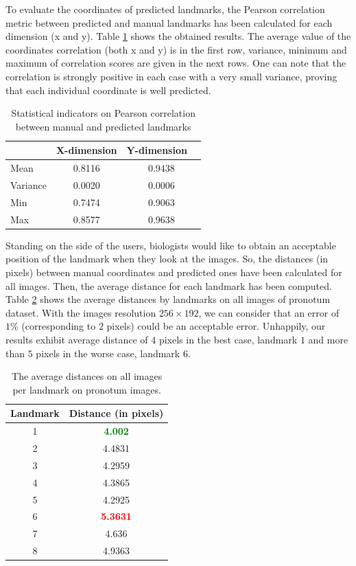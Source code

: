 \documentclass[review]{elsarticle}
\begin{document}
To evaluate the coordinates of predicted landmarks, the Pearson
correlation  metric  between predicted and manual landmarks has been
calculated for each dimension (x and y). Table \ref {tblcorrelation}
shows the obtained results. The average value of the coordinates
correlation (both x and y) is in the first row, variance,
minimum and maximum of correlation scores are given in the next
rows. One can note that the correlation is strongly positive in each
case with a very small variance, proving that each individual
coordinate is well predicted.
\begin{table}[htbp]
	\centering
	\begin{tabular}{ | l | c | c | }
\hline
	& X-dimension & Y-dimension  \  \\ \hline
	Mean & 0.8116 & 0.9438 \\ \hline
	Variance  & 0.0020 & 0.0006 \\ \hline
	Min  & 0.7474 & 0.9063 \\ \hline
	Max  & 0.8577 & 0.9638 \\ \hline
\end{tabular}
	\caption{Statistical indicators on Pearson correlation between manual and predicted landmarks}
	\label{tblcorrelation}
\end{table}

Standing on the side of the users, biologists would like to
obtain an acceptable position of the landmark when they look at the
images. So, the distances (in pixels) between manual coordinates and predicted
ones have been calculated for all images. Then, the average
distance for each landmark has been
computed. Table \ref{tblavgpronotum} shows the average distances by
landmarks on all images of pronotum dataset. With the images
resolution $256 \times 192$, we can consider that an error of $1\%$
(corresponding to $2$ pixels) could 
be an acceptable error. Unhappily, our results exhibit average
distance of $4$ pixels in the best case, landmark $1$ and more than
$5$ pixels in the worse case, landmark $6$.
\begin{table}[htbp]
	\centering	
	\begin{tabular}{|c|c|}
		\hline
		\textbf{Landmark} & \textbf{Distance} (in pixels) \\ \hline
		1 & \textcolor{green}{\textbf{4.002}}  \\ \hline
		2 & 4.4831 \\ \hline
		3 & 4.2959 \\ \hline
		4 & 4.3865 \\ \hline
		5 & 4.2925 \\ \hline
		6 & \textcolor{red}{\textbf{5.3631}} \\ \hline
		7 & 4.636 \\ \hline
		8 & 4.9363 \\ \hline
	\end{tabular}
	\caption{The average distances on all images per landmark on pronotum images.}
	\label{tblavgpronotum}
\end{table}
\end{document}
